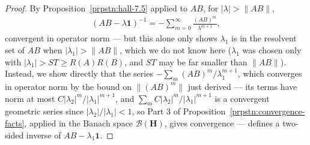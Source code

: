 \begin{proof}
By Proposition~\ref{prpstn:hall-7.5} applied to $AB$, for $\lvert \lambda \rvert > \|AB\|$,
\begin{align}
    (AB - \lambda\mathbf{1})^{-1} = -\sum_{m=0}^\infty \frac{(AB)^m}{\lambda^{m+1}}, \tag{$\P\P$}
\end{align}
convergent in operator norm — but this alone only shows $\lambda_1$ is in the resolvent set of $AB$ when $\lvert \lambda_1 \rvert > \|AB\|$, which we do not know here ($\lambda_1$ was chosen only with $\lvert \lambda_1 \rvert > ST \ge R(A)R(B)$, and $ST$ may be far smaller than $\|AB\|$). Instead, we show directly that the series $-\sum_m (AB)^m/\lambda_1^{m+1}$, which converges in operator norm by the bound on $\|(AB)^m\|$ just derived — its terms have norm at most $C\lvert \lambda_2 \rvert^m/\lvert \lambda_1 \rvert^{m+1}$, and $\sum_m C\lvert \lambda_2 \rvert^m/\lvert \lambda_1 \rvert^{m+1}$ is a convergent geometric series since $\lvert \lambda_2 \rvert/\lvert \lambda_1 \rvert<1$, so Part 3 of Proposition~\ref{prpstn:convergence-facts}, applied in the Banach space $\mathcal{B}(\mathbf{H})$, gives convergence — defines a two-sided inverse of $AB - \lambda_1\mathbf{1}$.


\end{proof}
